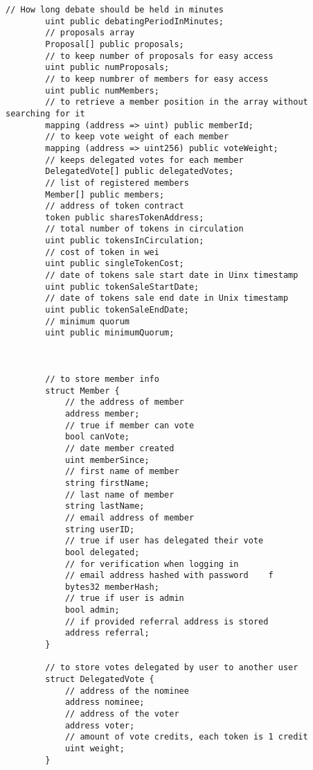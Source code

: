 \documentclass{article}
\begin{document}
\begin{lstlisting}[style=MyCStyle]
        // How long debate should be held in minutes
        uint public debatingPeriodInMinutes;
        // proposals array
        Proposal[] public proposals;
        // to keep number of proposals for easy access
        uint public numProposals;
        // to keep numbrer of members for easy access
        uint public numMembers;
        // to retrieve a member position in the array without searching for it
        mapping (address => uint) public memberId;
        // to keep vote weight of each member
        mapping (address => uint256) public voteWeight;
        // keeps delegated votes for each member
        DelegatedVote[] public delegatedVotes;
        // list of registered members
        Member[] public members;
        // address of token contract
        token public sharesTokenAddress;
        // total number of tokens in circulation
        uint public tokensInCirculation;
        // cost of token in wei
        uint public singleTokenCost;
        // date of tokens sale start date in Uinx timestamp
        uint public tokenSaleStartDate;
        // date of tokens sale end date in Unix timestamp
        uint public tokenSaleEndDate;
        // minimum quorum
        uint public minimumQuorum;



        // to store member info
        struct Member {
            // the address of member
            address member;
            // true if member can vote
            bool canVote;
            // date member created
            uint memberSince;
            // first name of member
            string firstName;
            // last name of member
            string lastName;
            // email address of member
            string userID;
            // true if user has delegated their vote
            bool delegated;
            // for verification when logging in
            // email address hashed with password    f
            bytes32 memberHash;
            // true if user is admin
            bool admin;
            // if provided referral address is stored
            address referral;
        }

        // to store votes delegated by user to another user
        struct DelegatedVote {
            // address of the nominee
            address nominee;
            // address of the voter
            address voter;
            // amount of vote credits, each token is 1 credit
            uint weight;
        }


\end{lstlisting}
\end{document}
